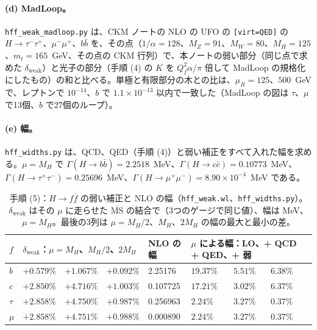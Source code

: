 \documentclass[a4paper,10pt]{ltjsarticle}
\newcommand{\MSbar}{\overline{\mathrm{MS}}}
\begin{document}
\paragraph{(d) MadLoop。}\texttt{hff\_weak\_madloop.py} は、CKM ノートの NLO の UFO の \texttt{[virt=QED]} の $H\to\tau^-\tau^+$、$\mu^-\mu^+$、$b\bar b$ を、その点（$1/\alpha=128$、$M_Z=91$、$M_W=80$、$M_H=125$、$m_t=165$~GeV、その点の CKM 行列）で、本ノートの弱い部分（同じ点で求めた $\delta_{\mathrm{weak}}$）と光子の部分（手順 (4) の $K$ を $Q_f^2\alpha/\pi$ 倍して MadLoop の規格化にしたもの）の和と比べる。単極と有限部分の木との比は、$\mu_R=125$、$500$~GeV で、レプトンで $10^{-14}$、$b$ で $1.1\times10^{-13}$ 以内で一致した（MadLoop の図は $\tau$、$\mu$ で13個、$b$ で27個のループ）。

\paragraph{(e) 幅。}\texttt{hff\_widths.py} は、QCD、QED（手順 (4)）と弱い補正をすべて入れた幅を求める。$\mu=M_H$ で $\Gamma(H\to b\bar b)=2.2518$~MeV、$\Gamma(H\to c\bar c)=0.10773$~MeV、$\Gamma(H\to\tau^+\tau^-)=0.25696$~MeV、$\Gamma(H\to\mu^+\mu^-)=8.90\times10^{-4}$~MeV である。

\begin{table}[tbp]
\centering\small
\caption{手順 (5)：$H\to f\bar f$ の弱い補正と NLO の幅（\texttt{hff\_weak.wl}、\texttt{hff\_widths.py}）。$\delta_{\mathrm{weak}}$ はその $\mu$ に走らせた $\MSbar$ の結合で（3つのゲージで同じ値）、幅は MeV、$\mu=M_H$。最後の3列は $\mu=M_H/2$、$M_H$、$2M_H$ の幅の最大と最小の差。}
\label{tab:hffweak}
\footnotesize\setlength{\tabcolsep}{3.5pt}
\begin{tabular}{lllllllll}
\toprule
$f$ & \multicolumn{3}{l}{$\delta_{\mathrm{weak}}$：$\mu=M_H$、$M_H/2$、$2M_H$} & NLO の幅 & \multicolumn{3}{l}{$\mu$ による幅：LO、+ QCD + QED、+ 弱} & \\
\midrule
$b$ & $+0.579\%$ & $+1.067\%$ & $+0.092\%$ & 2.25176 & $19.37\%$ & $5.51\%$ & $6.38\%$ & \\
$c$ & $+2.850\%$ & $+4.716\%$ & $+1.003\%$ & 0.107725 & $17.21\%$ & $3.02\%$ & $6.37\%$ & \\
$\tau$ & $+2.858\%$ & $+4.750\%$ & $+0.987\%$ & 0.256963 & $2.24\%$ & $3.27\%$ & $0.37\%$ & \\
$\mu$ & $+2.858\%$ & $+4.751\%$ & $+0.988\%$ & 0.000890 & $2.24\%$ & $3.27\%$ & $0.37\%$ & \\
\bottomrule
\end{tabular}
\end{table}
\end{document}
